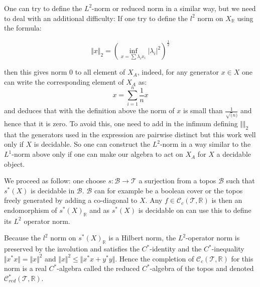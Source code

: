 \documentclass[a4paper]{article}
\newcommand{\R}{\mathbb{R}}
\newcommand{\Tcal}{\mathcal{T}}
\newcommand{\Ccal}{\mathcal{C}}
\newcommand{\Bcal}{\mathcal{B}}
\newcommand{\block}[1]
{

\par \subsubsection{} #1

\bigskip}
\begin{document}
\block{One can try to define the $L^2$-norm or reduced norm in a similar way, but we need to deal with an additional difficulty: If one try to define the $l^2$ norm on $X_{\R}$ using the formula:


\[ \Vert x \Vert_2 = \left( \inf_{x=\sum \lambda_i x_i} |\lambda_i|^2 \right)^\frac{1}{2} \]

then this gives norm $0$ to all element of $X_A$, indeed, for any generator $x \in X$ one can write the corresponding element of $X_A$ as:
\[ x = \sum_{i=1}^n \frac{1}{n} x \]
and deduces that with the definition above the norm of $x$ is small than $\frac{1}{\sqrt(n)}$ and hence that it is zero. To avoid this, one need to add in the infimum defining $\Vert \Vert_2$ that the generators used in the expression are pairwise distinct but this work well only if $X$ is decidable. So one can construct the $L^2$-norm in a way similar to the $L^1$-norm above only if one can make our algebra to act on $X_A$ for $X$ a decidable object.

\bigskip

We proceed as follow: one choose $s:\Bcal \rightarrow \Tcal$ a surjection from a topos $\Bcal$ such that $s^*(X)$ is decidable in $\Bcal$. $\Bcal$ can for example be a boolean cover or the topos freely generated by adding a co-diagonal to $X$. Any $f \in \Ccal_c(\Tcal,\R)$ is then an endomorphism of $s^*(X)_{\R}$ and as $s^*(X)$ is decidable on can use this to define its $L^2$ operator norm.


Because the $l^2$ norm on $s^*(X)_{\R}$ is a Hilbert norm, the $L^2$-operator norm is preserved by the involution and satisfies the $C^*$-identity and the $C^*$-inequality $\Vert x^* x \Vert = \Vert x \Vert^2$ and $\Vert x \Vert ^2 \leqslant \Vert  x^* x +y^* y \Vert$. Hence the completion of $\Ccal_c(\Tcal,\R)$ for this norm is a real $C^*$-algebra called the reduced $C^*$-algebra of the topos and denoted $\Ccal^*_{red}(\Tcal,\R)$.
}
\end{document}
